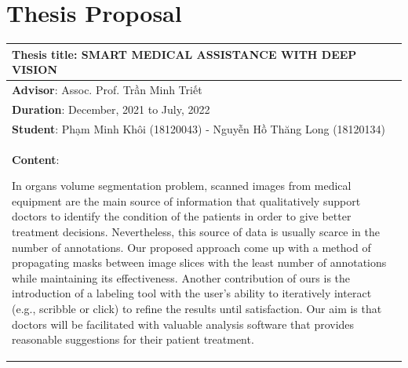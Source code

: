 \chapter{Thesis Proposal}
\begin{longtable}{|p{{{80mm}}}|c|}
\hline
\multicolumn{2}{|m{\linewidth}|}{\textbf{Thesis title}: SMART MEDICAL ASSISTANCE WITH DEEP VISION}\\
\hline
\multicolumn{2}{|m{\linewidth}|}{\textbf{Advisor}: Assoc. Prof. Trần Minh Triết} \\
\hline
\multicolumn{2}{|m{\linewidth}|}{\textbf{Duration}: December, 2021 to July, 2022}\\
\hline
\multicolumn{2}{|m{\linewidth}|}{\textbf{Student}: Phạm Minh Khôi (18120043) - Nguyễn Hồ Thăng Long (18120134)}\\
\hline

\hline
\multicolumn{2}{|m{\linewidth}|}{\textbf{Content}:\par

In organs volume segmentation problem, scanned images from medical equipment are the main source of information that qualitatively support doctors to identify the condition of the patients in order to give better treatment decisions. Nevertheless, this source of data is usually scarce in the number of annotations. Our proposed approach come up with a method of propagating masks between image slices with the least number of annotations while maintaining its effectiveness. Another contribution of ours is the introduction of a labeling tool with the user’s ability to iteratively interact (e.g., scribble or click) to refine the results until satisfaction. Our aim is that doctors will be facilitated with valuable analysis software that provides reasonable suggestions for their patient treatment.

}
\end{longtable}
